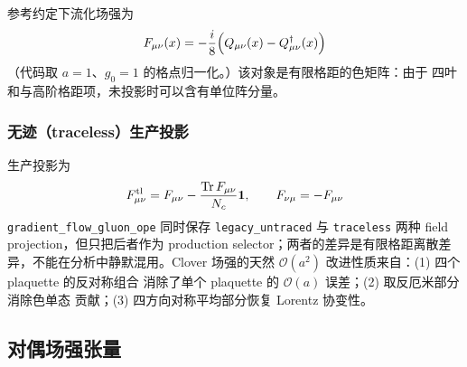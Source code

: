 \documentclass[11pt,a4paper]{ctexart}
\newcommand{\tr}{\operatorname{Tr}}
\newcommand{\order}[1]{\mathcal{O}(#1)}
\newcommand{\code}[1]{\texttt{#1}}
\begin{document}
\begin{center}
\end{center}

参考约定下流化场强为
\begin{equation}\label{eq:clover_F}
F_{\mu\nu}(x) = -\frac{i}{8}
\Bigl( Q_{\mu\nu}(x) - Q_{\mu\nu}^{\dagger}(x) \Bigr)
\end{equation}
（代码取 $a=1$、$g_0=1$ 的格点归一化。）该对象是有限格距的色矩阵：由于
四叶和与高阶格距项，未投影时可以含有单位阵分量。

\subsubsection{无迹（traceless）生产投影}

生产投影为
\begin{equation}\label{eq:traceless}
F_{\mu\nu}^{\rm tl} = F_{\mu\nu} - \frac{\tr F_{\mu\nu}}{N_c}\mathbf 1,
\qquad F_{\nu\mu}=-F_{\mu\nu}
\end{equation}
\code{gradient\_flow\_gluon\_ope} 同时保存 \code{legacy\_untraced} 与
\code{traceless} 两种 field projection，但只把后者作为 production
selector；两者的差异是有限格距离散差异，不能在分析中静默混用。Clover
场强的天然 $\order{a^2}$ 改进性质来自：(1) 四个 plaquette 的反对称组合
消除了单个 plaquette 的 $\order{a}$ 误差；(2) 取反厄米部分消除色单态
贡献；(3) 四方向对称平均部分恢复 Lorentz 协变性。

\subsection{对偶场强张量}
\end{document}
